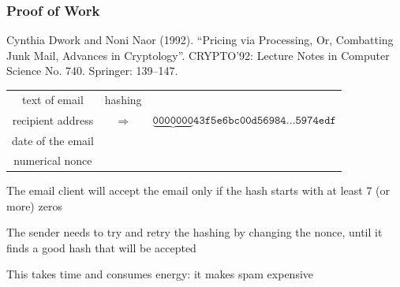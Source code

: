 \documentclass[11pt]{beamer}  %
\begin{document}
\begin{frame}\frametitle{Proof of Work}

  \begin{redbox}{}
    Cynthia Dwork and Noni Naor (1992). “Pricing via Processing, Or, Combatting Junk Mail, Advances in Cryptology”. CRYPTO’92: Lecture Notes in Computer Science No. 740. Springer: 139–147.
  \end{redbox}

  \bigskip

  \begin{tabular}{ccc}
    text of email & hashing & \\
    recipient address & $\Rightarrow$ & $\mathtt{\underbrace{0000000}43f5e6bc00d56984\ldots5974edf}$\\
    date of the email && \\
    numerical nonce &&
  \end{tabular}

  \bigskip

  The email client will accept the email only if the hash starts with at least 7 (or more) zeros

  \bigskip

  The sender needs to try and retry the hashing by changing the nonce, until it finds a good hash that will be accepted

  \bigskip

  This takes time and consumes energy: it makes spam expensive

\end{frame}
\end{document}
